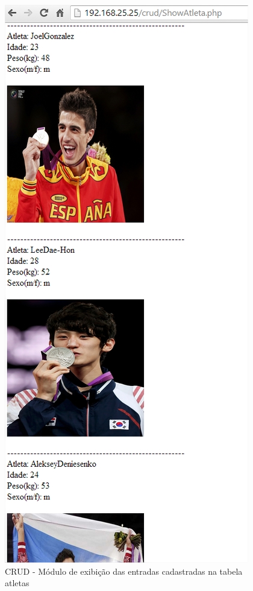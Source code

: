 \documentclass[10pt]{article}
\begin{document}
\begin{center}
\begin{figure}[h!]
\includegraphics[scale=0.35]{crud7-atletas.jpg}
\caption{CRUD - Módulo de exibição das entradas cadastradas na tabela atletas}
\end{figure}
\end{center}
\end{document}
